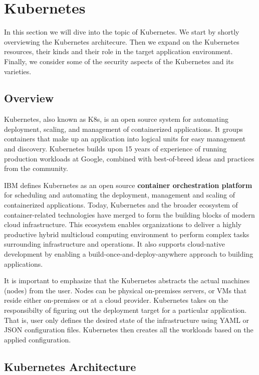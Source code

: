 \section{Kubernetes}

In this section we will dive into the topic of Kubernetes. We start by shortly overviewing the Kubernetes architecure. Then we expand on the Kubernetes resources, their kinds and their role in the target application environment. Finally, we consider some of the security aspects of the Kubernetes and its varieties.

\subsection{Overview}

Kubernetes, also known as K8s, is an open source system for automating deployment, scaling, and management of containerized applications. It groups containers that make up an application into logical units for easy management and discovery. Kubernetes builds upon 15 years of experience of running production workloads at Google, combined with best-of-breed ideas and practices from the community. \cite{kubernetes}

IBM defines Kubernetes as an open source \textbf{container orchestration platform} for scheduling and automating the deployment, management and scaling of containerized applications. Today, Kubernetes and the broader ecosystem of container-related technologies have merged to form the building blocks of modern cloud infrastructure. This ecosystem enables organizations to deliver a highly productive hybrid multicloud computing environment to perform complex tasks surrounding infrastructure and operations. It also supports cloud-native development by enabling a build-once-and-deploy-anywhere approach to building applications. \cite{ibm-kubernetes}

It is important to emphasize that the Kubernetes abstracts the actual machines (nodes) from the user. Nodes can be physical on-premises servers, or VMs that reside either on-premises or at a cloud provider. Kubernetes takes on the responsibilty of figuring out the deployment target for a particular application. That is, user only defines the desired state of the infrastructure using YAML or JSON configuration files. Kubernetes then creates all the workloads based on the applied configuration.

\subsection{Kubernetes Architecture}

